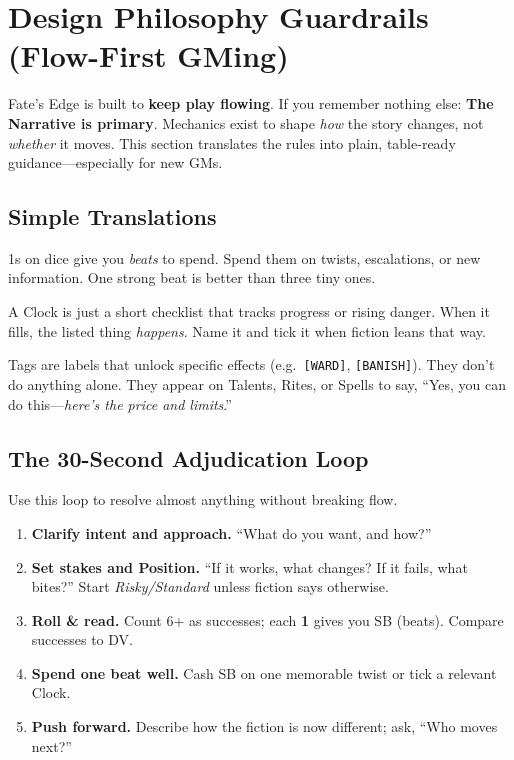 

\section{Design Philosophy Guardrails (Flow-First GMing)}
\label{sec:design-guardrails}

Fate’s Edge is built to \textbf{keep play flowing}. If you remember nothing else: \textbf{The Narrative is primary}. 
Mechanics exist to shape \emph{how} the story changes, not \emph{whether} it moves. 
This section translates the rules into plain, table-ready guidance—especially for new GMs.

\subsection{Simple Translations}
\begin{description}[leftmargin=1.5em, style=nextline]
  \item[Story Beats (SB) $\Rightarrow$ Story Beats:] 1s on dice give you \emph{beats} to spend. Spend them on twists, escalations, or new information. One strong beat is better than three tiny ones.
  \item[Clocks $\Rightarrow$ Checkboxes/Lists:] A Clock is just a short checklist that tracks progress or rising danger. When it fills, the listed thing \emph{happens}. Name it and tick it when fiction leans that way.
  \item[\texttt{[TAGS]} $\Rightarrow$ Gates with a Cost:] Tags are labels that unlock specific effects (e.g.\ \texttt{[WARD]}, \texttt{[BANISH]}). They don’t do anything alone. They appear on Talents, Rites, or Spells to say, ``Yes, you can do this—\emph{here’s the price and limits}.''
\end{description}

\subsection{The 30-Second Adjudication Loop}
Use this loop to resolve almost anything without breaking flow.
\begin{enumerate}
  \item \textbf{Clarify intent and approach.} ``What do you want, and how?''
  \item \textbf{Set stakes and Position.} ``If it works, what changes? If it fails, what bites?'' Start \emph{Risky/Standard} unless fiction says otherwise.
  \item \textbf{Roll \& read.} Count 6+ as successes; each \textbf{1} gives you SB (beats). Compare successes to DV.
  \item \textbf{Spend one beat well.} Cash SB on one memorable twist or tick a relevant Clock.
  \item \textbf{Push forward.} Describe how the fiction is now different; ask, ``Who moves next?''
\end{enumerate}

